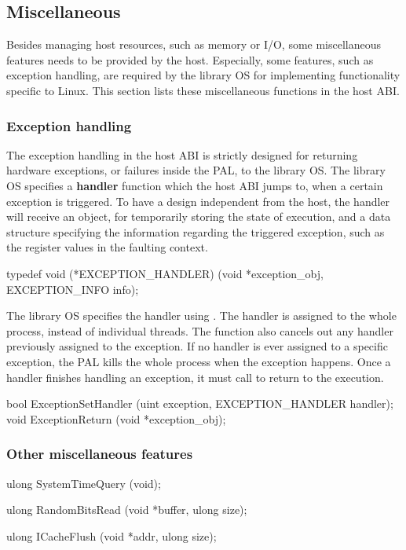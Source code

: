 \subsection{Miscellaneous}
\label{sec:abi:misc}


Besides managing host resources, such as memory or I/O, some miscellaneous features needs to be provided by the host.
Especially, some features, such as exception handling, are required
by the library OS
for implementing functionality specific to Linux.
This section lists these miscellaneous functions in the host ABI.



\subsubsection*{Exception handling}



The exception handling in the host ABI
is strictly designed for returning hardware exceptions,
or failures inside the PAL,
to the library OS.
The library OS specifies a {\bf handler} function which the host ABI
jumps to, when a certain exception is triggered.
To have a design independent from the host,
the handler will receive an object,
for temporarily storing the state of execution,
and a data structure
specifying the information regarding the triggered exception,
such as the register values in the faulting context.





\begin{paldef}
typedef void (*EXCEPTION_HANDLER)
            (void *exception_obj, EXCEPTION_INFO info);
\end{paldef}


The library OS specifies the handler
using .
The handler is assigned to the whole process,
instead of individual threads.
The function also
cancels out any handler previously assigned to the exception.
If no handler is ever assigned to a specific exception,
the PAL kills the whole process when the exception happens.
Once a handler finishes handling an exception,
it must call  to return to the execution.


\begin{paldef}
bool ExceptionSetHandler (uint exception,
                          EXCEPTION_HANDLER handler);
void ExceptionReturn     (void *exception_obj);
\end{paldef}




\subsubsection*{Other miscellaneous features}




\begin{paldef}
ulong SystemTimeQuery (void);
\end{paldef}





\begin{paldef}
ulong RandomBitsRead (void *buffer, ulong size);
\end{paldef}




\begin{paldef}
ulong ICacheFlush (void *addr, ulong size);
\end{paldef}

